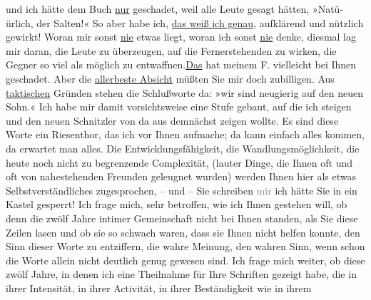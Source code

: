 \begin{ledgroupsized}[t]{13cm}
               und ich hätte dem Buch \uline{nur} geschadet, weil alle Leute
               gesagt hätten, »Natü-ürlich, der Salten!« So aber habe ich, \uline{das weiß ich genau}, aufklärend und nützlich gewirkt! Woran mir sonst
                  \uline{nie} etwas liegt, woran ich sonst \uline{nie} denke, diesmal lag mir daran, die Leute zu
               überzeugen, auf die Fernerstehenden zu wirken, die Gegner so viel als möglich zu
                  entwaffnen.\uline{Das} hat meinem F. vielleicht bei Ihnen geschadet. Aber die
                  \uline{allerbeste Absicht} müßten Sie mir doch zubilligen. \pend
           \pstart
           Aus \uline{taktischen} Gründen stehen die Schlußworte da:
                  »wir sind neugierig auf den
                  neuen Sohn.« Ich habe mir damit vorsichtsweise eine Stufe gebaut, auf die ich
               steigen und den neuen Schnitzler von da aus demnächst zeigen wollte. Es sind diese
               Worte ein Riesenthor, das ich vor Ihnen aufmache; da kann einfach alles kommen, da
               erwartet man alles. Die Entwicklungsfähigkeit, die Wandlungsmöglichkeit, die heute
               noch nicht zu begrenzende Complexität, (lauter Dinge, die Ihnen oft und oft von
               nahestehenden Freunden geleugnet wurden) werden Ihnen hier als etwas
               Selbstverständliches zugesprochen, – und – Sie schreiben \textcolor{gray}{mir} ich
               hätte Sie in ein Kastel gesperrt! \pend
           \pstart
           Ich frage mich, sehr betroffen, wie ich Ihnen gestehen will, ob denn die zwölf Jahre
               intimer Gemeinschaft nicht bei Ihnen standen, als Sie diese Zeilen lasen und ob sie
               so schwach waren,  dass sie Ihnen nicht helfen
               konnte, den Sinn dieser Worte zu entziffern, die wahre Meinung, den wahren Sinn, wenn
               schon die Worte allein nicht deutlich genug gewesen sind. Ich frage mich weiter, ob
               diese zwölf Jahre, in denen ich eine Theilnahme für Ihre Schriften gezeigt habe, die
               in ihrer Intensität, in ihrer Activität, in ihrer Beständigkeit wie in ihrem

\end{ledgroupsized}
